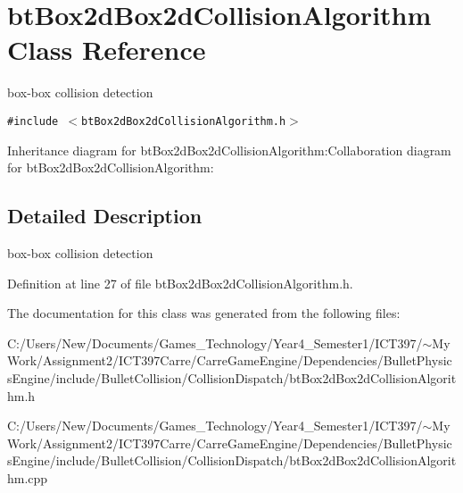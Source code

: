 \hypertarget{classbt_box2d_box2d_collision_algorithm}{
\section{btBox2dBox2dCollisionAlgorithm Class Reference}
\label{classbt_box2d_box2d_collision_algorithm}
}
box-box collision detection  


{\tt \#include $<$btBox2dBox2dCollisionAlgorithm.h$>$}

Inheritance diagram for btBox2dBox2dCollisionAlgorithm:Collaboration diagram for btBox2dBox2dCollisionAlgorithm:

\subsection{Detailed Description}
box-box collision detection 

Definition at line 27 of file btBox2dBox2dCollisionAlgorithm.h.

The documentation for this class was generated from the following files:\begin{CompactItemize}
\item 
C:/Users/New/Documents/Games\_\-Technology/Year4\_\-Semester1/ICT397/$\sim$My Work/Assignment2/ICT397Carre/CarreGameEngine/Dependencies/BulletPhysicsEngine/include/BulletCollision/CollisionDispatch/btBox2dBox2dCollisionAlgorithm.h\item 
C:/Users/New/Documents/Games\_\-Technology/Year4\_\-Semester1/ICT397/$\sim$My Work/Assignment2/ICT397Carre/CarreGameEngine/Dependencies/BulletPhysicsEngine/include/BulletCollision/CollisionDispatch/btBox2dBox2dCollisionAlgorithm.cpp\end{CompactItemize}
